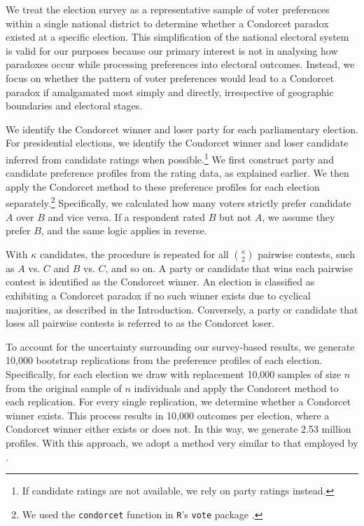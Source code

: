 \documentclass[12pt]{scrartcl}
\newcommand{\nbboostraprep}{2.53 } %
\begin{document}
We treat the election survey as a representative sample of voter preferences within a single national district to determine whether a Condorcet paradox existed at a specific election. This simplification of the national electoral system is valid for our purposes because our primary interest is not in analysing how paradoxes occur while processing preferences into electoral outcomes. Instead, we focus on whether the pattern of voter preferences would lead to a Condorcet paradox if amalgamated most simply and directly, irrespective of geographic boundaries and electoral stages.

We identify the Condorcet winner and loser party for each parliamentary election. For presidential elections, we identify the Condorcet winner and loser candidate inferred from candidate ratings when possible.\footnote{
    If candidate ratings are not available, we rely on party ratings instead.
} 
We first construct party and candidate preference profiles from the rating data, as explained earlier. We then apply the Condorcet method to these preference profiles for each election separately.\footnote{
    We used the \texttt{condorcet} function in \texttt{R}'s \texttt{vote} package \citep{vote}.
}  Specifically, we calculated how many voters strictly prefer candidate $A$ over $B$ and vice versa. If a respondent rated $B$ but not $A$, we assume they prefer $B$, and the same logic applies in reverse. 

With $\kappa$ candidates, the procedure is repeated for all $\binom{\kappa}{2}$ pairwise contests, such as $A$ vs. $C$ and $B$ vs. $C$, and so on. A party or candidate that wins each pairwise contest is identified as the Condorcet winner. An election is classified as exhibiting a Condorcet paradox if no such winner exists due to cyclical majorities, as described in the Introduction. Conversely, a party or candidate that loses all pairwise contests is referred to as the Condorcet loser.

To account for the uncertainty surrounding our survey-based results, we generate 10,000 bootstrap replications from the preference profiles of each election. Specifically, for each election we draw with replacement 10,000 samples of size $n$ from the original sample of $n$ individuals and apply the Condorcet method to each replication. For every single replication, we determine whether a Condorcet winner exists. This process results in 10,000 outcomes per election, where a Condorcet winner either exists or does not. In this way, we generate \nbboostraprep million profiles. With this approach, we adopt a method very similar to that employed by \cite{Darmann2019}.
\end{document}
